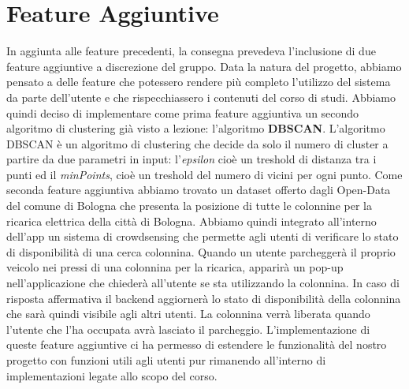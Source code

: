 \documentclass[../../Report.tex]{subfiles}
\begin{document}
    \section{Feature Aggiuntive}
    In aggiunta alle feature precedenti, la consegna prevedeva l'inclusione di due feature aggiuntive a discrezione del gruppo. Data la natura del progetto, abbiamo pensato a delle feature che potessero rendere più completo l'utilizzo del sistema da parte dell'utente e che rispecchiassero i contenuti del corso di studi. Abbiamo quindi deciso di implementare come prima feature aggiuntiva un secondo algoritmo di clustering già visto a lezione: l'algoritmo \textbf{DBSCAN}. L'algoritmo DBSCAN è un algoritmo di clustering che decide da solo il numero di cluster a partire da due parametri in input: l'\emph{epsilon} cioè un treshold di distanza tra i punti ed il \emph{minPoints}, cioè un treshold del numero di vicini per ogni punto.  Come seconda feature aggiuntiva abbiamo trovato un dataset offerto dagli Open-Data del comune di Bologna che presenta la posizione di tutte le colonnine per la ricarica elettrica della città di Bologna. Abbiamo quindi integrato all'interno dell'app un sistema di crowdsensing che permette agli utenti di verificare lo stato di disponibilità di una cerca colonnina. Quando un utente parcheggerà il proprio veicolo nei pressi di una colonnina per la ricarica, apparirà un pop-up nell'applicazione che chiederà all'utente se sta utilizzando la colonnina. In caso di risposta affermativa il backend aggiornerà lo stato di disponibilità della colonnina che sarà quindi visibile agli altri utenti. La colonnina verrà liberata quando l'utente che l'ha occupata avrà lasciato il parcheggio. L'implementazione di queste feature aggiuntive ci ha permesso di estendere le funzionalità del nostro progetto con funzioni utili agli utenti pur rimanendo all'interno di implementazioni legate allo scopo del corso. \\
    
\end{document}
